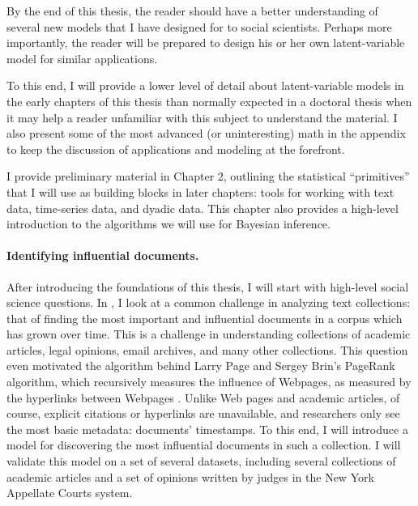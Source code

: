 By the end of this thesis, the reader should have a better
understanding of several new models that I have designed for to social
scientists.  Perhaps more importantly, the reader will be prepared to
design his or her own latent-variable model for similar applications.

To this end, I will provide a lower level of detail about
latent-variable models in the early chapters of this thesis than
normally expected in a doctoral thesis when it may help a reader
unfamiliar with this subject to understand the material.  I also
present some of the most advanced (or uninteresting) math in the
appendix to keep the discussion of applications and modeling at the
forefront.

I provide preliminary material in Chapter 2, outlining the statistical
``primitives'' that I will use as building blocks in later chapters:
tools for working with text data, time-series data, and dyadic data.
This chapter also provides a high-level introduction to the algorithms
we will use for Bayesian inference.

\paragraph{Identifying influential documents.} After introducing the
foundations of this thesis, I will start with high-level social
science questions.  In , I look at a common challenge
in analyzing text collections: that of finding the most important and
influential documents in a corpus which has grown over time.  This is
a challenge in understanding collections of academic articles, legal
opinions, email archives, and many other collections. This question
even motivated the algorithm behind Larry Page and Sergey Brin's
PageRank algorithm, which recursively measures the influence of
Webpages, as measured by the hyperlinks between Webpages
\citep{garfield:1992,brin:1998,garfield:2002}.  Unlike Web pages and
academic articles, of course, explicit citations or hyperlinks are
unavailable, and researchers only see the most basic metadata:
documents' timestamps.  To this end, I will introduce a model for
discovering the most influential documents in such a collection. I
will validate this model on a set of several datasets, including
several collections of academic articles and a set of opinions written
by judges in the New York Appellate Courts system.

